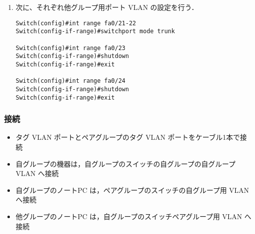 \documentclass[a4j,titlepage]{jarticle}
\begin{document}
\begin{enumerate}
\begin{itemize}
  \end{itemize}

\item 次に、それぞれ他グループ用ポート VLAN の設定を行う．
  
  \begin{center}
    \begin{screen}
\begin{verbatim}
Switch(config)#int range fa0/21-22
Switch(config-if-range)#switchport mode trunk

Switch(config)#int range fa0/23
Switch(config-if-range)#shutdown
Switch(config-if-range)#exit

Switch(config)#int range fa0/24
Switch(config-if-range)#shutdown
Switch(config-if-range)#exit
\end{verbatim}
\end{screen}
\end{center}

\end{enumerate}


\subsubsection{接続}
\begin{itemize}
\item タグ VLAN ポートとペアグループのタグ VLAN ポートをケーブル1本で接続

\item 自グループの機器は，自グループのスイッチの自グループの自グループ VLAN へ接続

\item 自グループのノートPC は，ペアグループのスイッチの自グループ用 VLAN へ接続

\item 他グループのノートPC は，自グループのスイッチペアグループ用 VLAN へ接続

\end{itemize}
\end{document}
